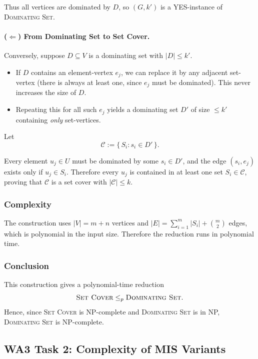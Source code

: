 \documentclass[9pt]{extarticle}
\begin{document}
Thus all vertices are dominated by $D$, so $(G,k')$ is a YES-instance of
\textsc{Dominating Set}.

\paragraph{($\Leftarrow$) From Dominating Set to Set Cover.}

Conversely, suppose $D \subseteq V$ is a dominating set with $|D| \le k'$.

\begin{itemize}
    \item If $D$ contains an element-vertex $e_j$, we can replace it by any
          adjacent set-vertex (there is always at least one, since $e_j$ must be
          dominated).  This never increases the size of $D$.
    \item Repeating this for all such $e_j$ yields a dominating set $D'$ of size
          $\le k'$ containing \emph{only} set-vertices.
\end{itemize}

Let
\[
    \mathcal{C} := \{\, S_i : s_i \in D' \,\}.
\]

Every element $u_j \in U$ must be dominated by some $s_i \in D'$, and the edge
$(s_i, e_j)$ exists only if $u_j \in S_i$.  Therefore every $u_j$ is contained
in at least one set $S_i \in \mathcal{C}$, proving that $\mathcal{C}$ is a set
cover with $|\mathcal{C}| \le k$.

\subsubsection*{Complexity}

The construction uses $|V| = m + n$ vertices and $|E| =
\sum_{i=1}^m |S_i| + \binom{m}{2}$ edges, which is polynomial in the input size.
Therefore the reduction runs in polynomial time.

\subsubsection*{Conclusion}

This construction gives a polynomial-time reduction
\[
    \textsc{Set Cover} \le_p \textsc{Dominating Set}.
\]
Hence, since \textsc{Set Cover} is NP-complete and \textsc{Dominating Set} is in NP,
\textsc{Dominating Set} is NP-complete.


\subsection{WA3 Task 2: Complexity of MIS Variants}
\end{document}
